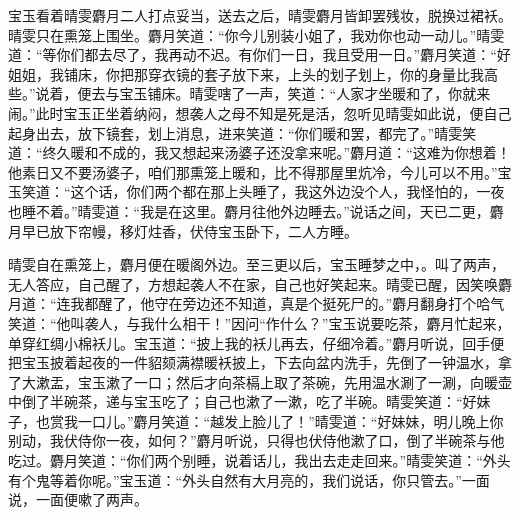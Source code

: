 宝玉看着晴雯麝月二人打点妥当，送去之后，晴雯麝月皆卸罢残妆，脱换过裙袄。晴雯只在熏笼上围坐。麝月笑道：``你今儿别装小姐了，我劝你也动一动儿。''晴雯道：``等你们都去尽了，我再动不迟。有你们一日，我且受用一日。''麝月笑道：``好姐姐，我铺床，你把那穿衣镜的套子放下来，上头的划子划上，你的身量比我高些。''说着，便去与宝玉铺床。晴雯嗐了一声，笑道：``人家才坐暖和了，你就来闹。''此时宝玉正坐着纳闷，想袭人之母不知是死是活，忽听见晴雯如此说，便自己起身出去，放下镜套，划上消息，进来笑道：``你们暖和罢，都完了。''晴雯笑道：``终久暖和不成的，我又想起来汤婆子还没拿来呢。''麝月道：``这难为你想着！他素日又不要汤婆子，咱们那熏笼上暖和，比不得那屋里炕冷，今儿可以不用。''宝玉笑道：``这个话，你们两个都在那上头睡了，我这外边没个人，我怪怕的，一夜也睡不着。''晴雯道：``我是在这里。麝月往他外边睡去。''说话之间，天已二更，麝月早已放下帘幔，移灯炷香，伏侍宝玉卧下，二人方睡。

晴雯自在熏笼上，麝月便在暖阁外边。至三更以后，宝玉睡梦之中，。叫了两声，无人答应，自己醒了，方想起袭人不在家，自己也好笑起来。晴雯已醒，因笑唤麝月道：``连我都醒了，他守在旁边还不知道，真是个挺死尸的。''麝月翻身打个哈气笑道：``他叫袭人，与我什么相干！''因问``作什么？''宝玉说要吃茶，麝月忙起来，单穿红绸小棉袄儿。宝玉道：``披上我的袄儿再去，仔细冷着。''麝月听说，回手便把宝玉披着起夜的一件貂颏满襟暖袄披上，下去向盆内洗手，先倒了一钟温水，拿了大漱盂，宝玉漱了一口；然后才向茶槅上取了茶碗，先用温水涮了一涮，向暖壶中倒了半碗茶，递与宝玉吃了；自己也漱了一漱，吃了半碗。晴雯笑道：``好妹子，也赏我一口儿。''麝月笑道：``越发上脸儿了！''晴雯道：``好妹妹，明儿晚上你别动，我伏侍你一夜，如何？''麝月听说，只得也伏侍他漱了口，倒了半碗茶与他吃过。麝月笑道：``你们两个别睡，说着话儿，我出去走走回来。''晴雯笑道：``外头有个鬼等着你呢。''宝玉道：``外头自然有大月亮的，我们说话，你只管去。''一面说，一面便嗽了两声。

